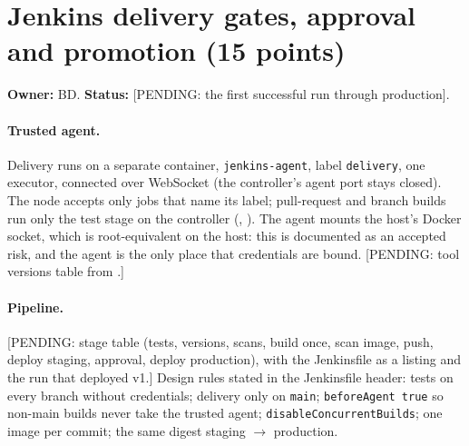 
\section{Jenkins delivery gates, approval and promotion (15 points)}\label{Section:deliveryJenkins}
\textbf{Owner:} BD. \textbf{Status:} [PENDING: the first successful run through production].

\paragraph{Trusted agent.} Delivery runs on a separate container, \texttt{jenkins-agent}, label \texttt{delivery}, one executor, connected
over WebSocket (the controller's agent port stays closed). The node accepts only jobs that name its label; pull-request and branch builds
run only the test stage on the controller (, ). The agent mounts the host's Docker socket, which is root-equivalent
on the host: this is documented as an accepted risk, and the agent is the only place that credentials are bound. [PENDING: tool versions table from .]

\paragraph{Pipeline.} [PENDING: stage table (tests, versions, scans, build once, scan image, push, deploy staging, approval, deploy production), with the
Jenkinsfile as a listing and the run that deployed v1.] Design rules stated in the Jenkinsfile header: tests on every branch without credentials;
delivery only on \texttt{main}; \texttt{beforeAgent true} so non-main builds never take the trusted agent; \texttt{disableConcurrentBuilds}; one image per commit;
the same digest staging $\to$ production.

